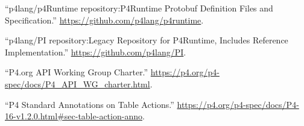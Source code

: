 \documentclass[11pt]{article}
\begin{document}
{{\begin{thebibliography}{37}
\mdbibitemlabel{{}[14]}\textquotedblleft{}p4lang/p4Runtime repository:P4Runtime Protobuf Definition Files and Specification.\textquotedblright{} \href{https://github.com/p4lang/p4runtime}{{\ttfamily https://\hspace{0pt}github.\hspace{0pt}com/\hspace{0pt}p4lang/\hspace{0pt}p4runtime}}.\label{p4runtimerepo}%

\mdbibitemlabel{{}[15]}\textquotedblleft{}p4lang/PI repository:Legacy Repository for P4Runtime, Includes Reference Implementation.\textquotedblright{} \href{https://github.com/p4lang/PI}{{\ttfamily https://\hspace{0pt}github.\hspace{0pt}com/\hspace{0pt}p4lang/\hspace{0pt}PI}}.\label{pirepo}%

\mdbibitemlabel{{}[16]}\textquotedblleft{}P4.org API Working Group Charter.\textquotedblright{} \href{https://p4.org/p4-spec/docs/P4_API_WG_charter.html}{{\ttfamily https://\hspace{0pt}p4.\hspace{0pt}org/\hspace{0pt}p4-\hspace{0pt}spec/\hspace{0pt}docs/\hspace{0pt}P4\_\hspace{0pt}API\_\hspace{0pt}WG\_\hspace{0pt}charter.\hspace{0pt}html}}.\label{p4apiwgcharter}%

\mdbibitemlabel{{}[17]}\textquotedblleft{}P4 Standard Annotations on Table Actions.\textquotedblright{} \href{https://p4.org/p4-spec/docs/P4-16-v1.2.0.html\%23sec-table-action-anno}{{\ttfamily https://\hspace{0pt}p4.\hspace{0pt}org/\hspace{0pt}p4-\hspace{0pt}spec/\hspace{0pt}docs/\hspace{0pt}P4-\hspace{0pt}16-\hspace{0pt}v1.\hspace{0pt}2.\hspace{0pt}0.\hspace{0pt}html\#\hspace{0pt}sec-\hspace{0pt}table-\hspace{0pt}action-\hspace{0pt}anno}}.\label{p4actionannotations}%


\end{thebibliography}}}
\end{document}
